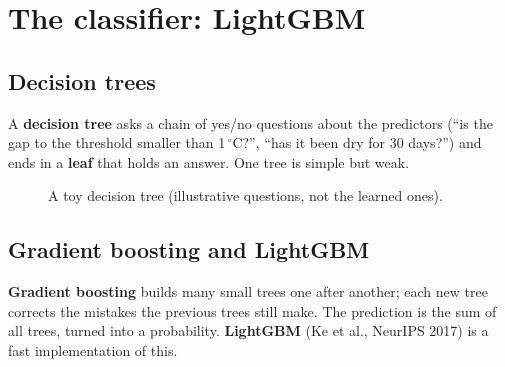 \chapter{The classifier: LightGBM}
\label{ch:clf}

\section{Decision trees}
A \textbf{decision tree} asks a chain of yes/no questions about the predictors (``is the gap to the threshold smaller
than 1\,$^\circ$C?'', ``has it been dry for 30 days?'') and ends in a \textbf{leaf} that holds an answer. One tree is
simple but weak.

\begin{figure}[H]
\centering
{}
\caption{A toy decision tree (illustrative questions, not the learned ones).}
\end{figure}

\section{Gradient boosting and LightGBM}
\textbf{Gradient boosting} builds many small trees one after another; each new tree corrects the mistakes the previous
trees still make. The prediction is the sum of all trees, turned into a probability. \textbf{LightGBM} (Ke et al.,
NeurIPS 2017) is a fast implementation of this.

